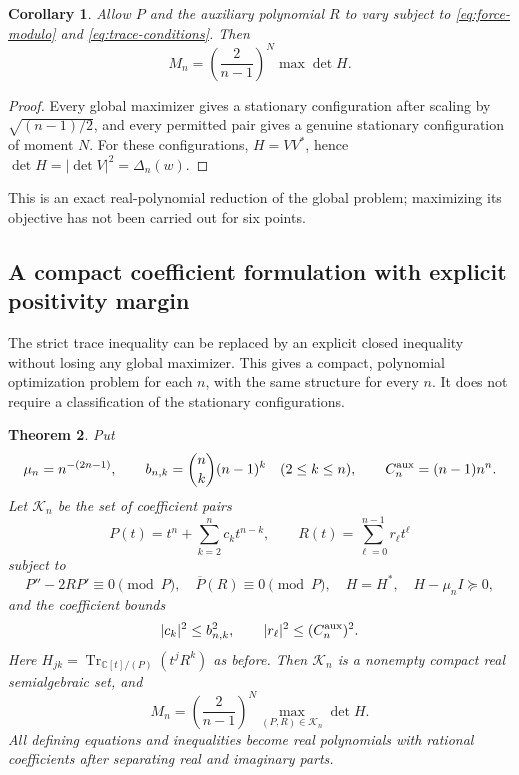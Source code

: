 \documentclass[11pt]{article}
\newtheorem{theorem}{Theorem}[section]
\newtheorem{corollary}[theorem]{Corollary}
\theoremstyle{remark}
\numberwithin{equation}{section}
\begin{document}
\begin{corollary}\label{cor:trace-global}
Allow $P$ and the auxiliary polynomial $R$ to vary subject to
\eqref{eq:force-modulo} and \eqref{eq:trace-conditions}. Then
\begin{equation}\label{eq:trace-global}
 M_n=\left(\frac2{n-1}\right)^N\max\det H.
\end{equation}
\end{corollary}
\begin{proof}
Every global maximizer gives a stationary configuration after scaling
by $\sqrt{(n-1)/2}$, and every permitted pair gives a genuine
stationary configuration of moment $N$. For these configurations,
$H=VV^*$, hence $\det H=|\det V|^2=\Delta_n(w)$.
\end{proof}
This is an exact real-polynomial reduction of the global problem;
maximizing its objective has not been carried out for six points.

\subsection{A compact coefficient formulation with explicit positivity margin}

The strict trace inequality can be replaced by an explicit closed inequality
without losing any global maximizer.  This gives a compact, polynomial
optimization problem for each $n$, with the same structure for every $n$.
It does not require a classification of the stationary configurations.

\begin{theorem}\label{thm:compact-trace}
Put
\[
 \mu_n=n^{-(2n-1)},\qquad
 b_{n,k}=\binom nk(n-1)^k\quad(2\le k\le n),\qquad
 C_n^{\rm aux}=(n-1)n^n.
\]
Let $\mathcal K_n$ be the set of coefficient pairs
\[
 P(t)=t^n+\sum_{k=2}^n c_kt^{n-k},\qquad
 R(t)=\sum_{\ell=0}^{n-1}r_\ell t^\ell
\]
subject to
\[
 P''-2RP'\equiv0\pmod P,\quad
 \overline P(R)\equiv0\pmod P,\quad
 H=H^*,\quad H-\mu_n I\succeq0,
\]
and the coefficient bounds
\[
 |c_k|^2\le b_{n,k}^2,\qquad
 |r_\ell|^2\le(C_n^{\rm aux})^2.
\]
Here $H_{jk}=\operatorname{Tr}_{\mathbb C[t]/(P)}(t^jR^k)$ as before.
Then $\mathcal K_n$ is a nonempty compact real semialgebraic set,
and
\[
 M_n=\left(\frac2{n-1}\right)^N
               \max_{(P,R)\in\mathcal K_n}\det H.
\]
All defining equations and inequalities become real polynomials with
rational coefficients after separating real and imaginary parts.
\end{theorem}
\end{document}
